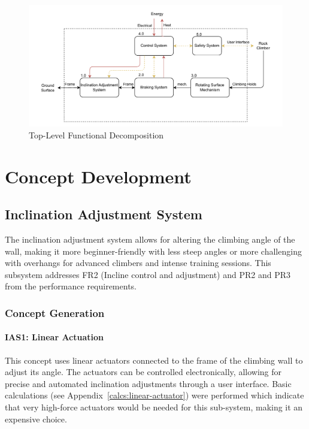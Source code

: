 \begin{figure}[H]
    \centering
    \includegraphics[width=1\linewidth]{figs/concept_design/Functional_Decomp_Flow.pdf}
    \caption{Top-Level Functional Decomposition}
    \label{fig:functional-decomp}
\end{figure}

\section{Concept Development}

\subsection{Inclination Adjustment System}

The inclination adjustment system allows for altering the climbing angle of the wall, making it more beginner-friendly with less steep angles or more challenging with overhangs for advanced climbers and intense training sessions. This subsystem addresses FR2 (Incline control and adjustment) and PR2 and PR3 from the performance requirements.

\subsubsection{Concept Generation}

\paragraph{IAS1: Linear Actuation}

This concept uses linear actuators connected to the frame of the climbing wall to adjust its angle. The actuators can be controlled electronically, allowing for precise and automated inclination adjustments through a user interface. Basic calculations (see Appendix~\ref{calcs:linear-actuator}) were performed which indicate that very high-force actuators would be needed for this sub-system, making it an expensive choice.

